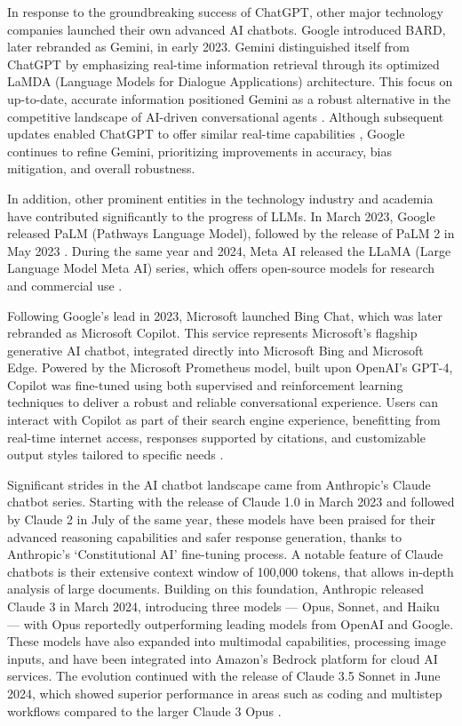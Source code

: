 In response to the groundbreaking success of ChatGPT, other major technology companies launched their own advanced AI chatbots. Google introduced BARD, later rebranded as Gemini, in early 2023. Gemini distinguished itself from ChatGPT by emphasizing real-time information retrieval through its optimized LaMDA (Language Models for Dialogue Applications) architecture. This focus on up-to-date, accurate information positioned Gemini as a robust alternative in the competitive landscape of AI-driven conversational agents \cite{team2023gemini}. Although subsequent updates enabled ChatGPT to offer similar real-time capabilities \cite{aljazeera2023chatgpt}, Google continues to refine Gemini, prioritizing improvements in accuracy, bias mitigation, and overall robustness.

In addition, other prominent entities in the technology industry and academia have contributed significantly to the progress of LLMs. In March 2023, Google released PaLM (Pathways Language Model), followed by the release of PaLM 2 in May 2023 \cite{chowdhery2023palm}. During the same year and 2024, Meta AI released the LLaMA (Large Language Model Meta AI) series, which offers open-source models for research and commercial use \cite{touvron2023llama}.

Following Google’s lead in 2023, Microsoft launched Bing Chat, which was later rebranded as Microsoft Copilot. This service represents Microsoft’s flagship generative AI chatbot, integrated directly into Microsoft Bing and Microsoft Edge. Powered by the Microsoft Prometheus model, built upon OpenAI’s GPT-4, Copilot was fine-tuned using both supervised and reinforcement learning techniques to deliver a robust and reliable conversational experience. Users can interact with Copilot as part of their search engine experience, benefitting from real-time internet access, responses supported by citations, and customizable output styles tailored to specific needs \cite{microsoft2024copilot, wikipedia2023copilot}.

Significant strides in the AI chatbot landscape came from Anthropic’s Claude chatbot series. Starting with the release of Claude 1.0 in March 2023 and followed by Claude 2 in July of the same year, these models have been praised for their advanced reasoning capabilities and safer response generation, thanks to Anthropic’s ‘Constitutional AI’ fine-tuning process. A notable feature of Claude chatbots is their extensive context window of 100,000 tokens, that allows in-depth analysis of large documents. Building on this foundation, Anthropic released Claude 3 in March 2024, introducing three models — Opus, Sonnet, and Haiku — with Opus reportedly outperforming leading models from OpenAI and Google. These models have also expanded into multimodal capabilities, processing image inputs, and have been integrated into Amazon’s Bedrock platform for cloud AI services. The evolution continued with the release of Claude 3.5 Sonnet in June 2024, which showed superior performance in areas such as coding and multistep workflows compared to the larger Claude 3 Opus \cite{wikipedia2024anthropic}.

